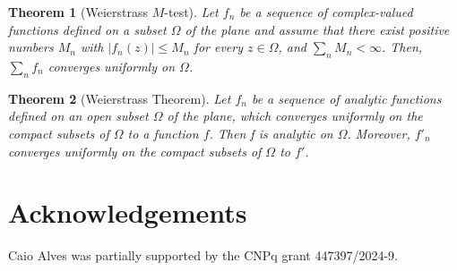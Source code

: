 \documentclass[a4paper]{amsart}
\newtheorem{theorem}{Theorem}
\begin{document}
\begin{theorem}[Weierstrass $M$-test]\label{t:Mtest}Let $f_n$ be a sequence of complex-valued functions defined on a subset $\Omega$ of the plane and assume that there exist positive numbers $M_n$ with $|f_n(z)| \le  M_n$ for every $z\in \Omega$, and $\sum_n M_n < \infty$. Then, $\sum_n f_n$ converges uniformly on $\Omega$.
    
\end{theorem}
\begin{theorem}[Weierstrass Theorem]\label{t:Wei} Let $f_n$ be a sequence of analytic functions defined on an open subset $\Omega$ of the plane, which converges uniformly on the compact subsets of $\Omega$ to a function $f$. Then f is analytic on $\Omega$. Moreover, $f'_n$ converges uniformly on the compact subsets of $\Omega$ to $f'$.
    
\end{theorem}

\section*{Acknowledgements}

Caio Alves was partially supported by the CNPq grant 447397/2024-9.




\end{document}
